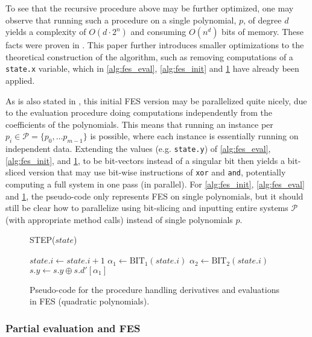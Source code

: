 To see that the recursive procedure above may be further optimized, one may observe that running such a procedure on a single polynomial, $p$, of degree $d$ yields a complexity of $O(d\cdot2^n)$ and consuming $O(n^d)$ bits of memory. These facts were proven in \cite{ches-2010-23990}. This paper further introduces smaller optimizations to the theoretical construction of the algorithm, such as removing computations of a \texttt{state.x} variable, which in \cref{alg:fes_eval}, \ref{alg:fes_init} and \ref{alg:fes_step} have already been applied. 

As is also stated in \cite{ches-2010-23990}, this initial FES version may be parallelized quite nicely, due to the evaluation procedure doing computations independently from the coefficients of the polynomials. This means that running an instance per $p_i \in \mathcal{P} = \{p_0, \dots p_{m-1}\}$ is possible, where each instance is essentially running on independent data. Extending the values (e.g. \texttt{state.y}) of \cref{alg:fes_eval}, \ref{alg:fes_init}, and \ref{alg:fes_step}, to be bit-vectors instead of a singular bit then yields a bit-sliced version that may use bit-wise instructions of \texttt{xor} and \texttt{and}, potentially computing a full system in one pass (in parallel). For \cref{alg:fes_init}, \cref{alg:fes_eval} and \cref{alg:fes_step}, the pseudo-code only represents FES on single polynomials, but it should still be clear how to parallelize using bit-slicing and inputting entire systems $\mathcal{P}$ (with appropriate method calls) instead of single polynomials $p$. 

\begin{figure}[t]
    \begin{alg}
        \caption{STEP($state$)} \label{alg:fes_step}
        $state.i \gets state.i + 1$\;
        $\alpha_1 \gets \text{BIT}_1(state.i)$\;
        $\alpha_2 \gets \text{BIT}_2(state.i)$\;
        $s.y \gets s.y \oplus s.d'[\alpha_1]$\;
    \end{alg}
    \caption{Pseudo-code for the procedure handling derivatives and evaluations in FES (quadratic polynomials).}
\end{figure}

\subsubsection{Partial evaluation and FES}

